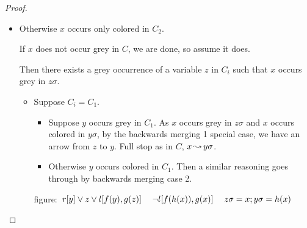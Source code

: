 \documentclass[,%
	paper=a4,%
	DIV10, %
	twoside=false,%
	liststotoc,
	bibtotoc,
	draft=false,%
	numbers=noendperiod
]{scrartcl}
\begin{document}
\begin{proof}
\begin{description}
\begin{itemize}
\begin{itemize}
					\item

					Otherwise $x$ occurs only colored in $C_2$.


					If $x$ does not occur grey in $C$, we are done, so assume it does.

					Then there exists a grey occurrence of a variable $z$ in $C_i$ such that $x$ occurs grey in $z\sigma$.

					\begin{itemize}
						\item Suppose $C_i = C_1$.

							\begin{itemize}
								\item
									Suppose $y$ occurs grey in $C_1$.
									As $x$ occurs grey in $z\sigma$ and $x$ occurs colored in $y\sigma$, by the backwards merging 1 special case, we have an arrow from $z$ to $y$. Full stop as in $C$, $x\operatorname{\leadsto} y\sigma$.

								\item
									Otherwise $y$ occurs colored in $C_1$. Then a similar reasoning goes through by backwards merging case 2.
							\end{itemize}

							\mbox{figure: $ r[y] \lor z \lor l[f(y), g(z)]\quad\; \lnot l[f(h(x)), g(x)]\;\quad z\sigma = x;y\sigma=h(x)$}



\end{itemize}
\end{itemize}
\end{itemize}
\end{description}
\end{proof}
\end{document}
